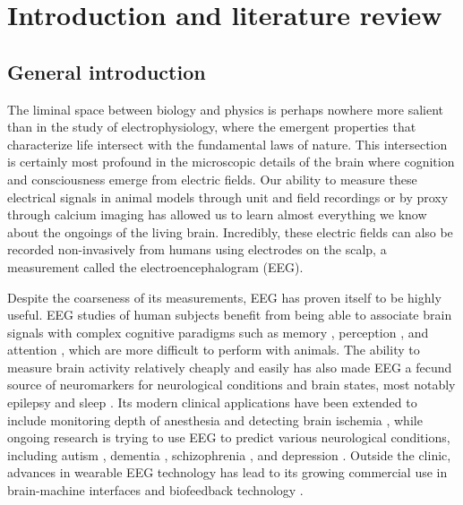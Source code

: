 \chapter{Introduction and literature review} \label{sec:intro}


\section{General introduction}

The liminal space between biology and physics is perhaps nowhere more salient than in the study of electrophysiology, where the emergent properties that characterize life intersect with the fundamental laws of nature. This intersection is certainly most profound in the microscopic details of the brain where cognition and consciousness emerge from electric fields. Our ability to measure these electrical signals in animal models through unit and field recordings or by proxy through calcium imaging has allowed us to learn almost everything we know about the ongoings of the living brain. Incredibly, these electric fields can also be recorded non-invasively from humans using electrodes on the scalp, a measurement called the electroencephalogram (EEG). 

Despite the coarseness of its measurements, EEG has proven itself to be highly useful. EEG studies of human subjects benefit from being able to associate brain signals with complex cognitive paradigms such as memory \cite{Osipova2006, Sauseng2009, Sauseng2010}, perception \cite{Rodriguez1999, Melloni2007,Fahrenfort2012}, and attention \cite{Hillyard1998, Makeig2002}, which are more difficult to perform with animals. The ability to measure brain activity relatively cheaply and easily has also made EEG a fecund source of neuromarkers for neurological conditions and brain states, most notably epilepsy \cite{Engel1984,Noachtar2009} and sleep \cite{Wolpert1969, Prerau2016}. Its modern clinical applications have been extended to include monitoring depth of anesthesia \cite{Michael2008} and detecting brain ischemia \cite{Meghdadi2021}, while ongoing research is trying to use EEG to predict various neurological conditions, including autism \cite{Bosl2018}, dementia \cite{Meghdadi2021}, schizophrenia \cite{Meghdadi2021}, and depression \cite{DeAguiarNeto2019}. Outside the clinic, advances in wearable EEG technology has lead to its growing commercial use in brain-machine interfaces \cite{Mahmood2021} and biofeedback technology \cite{Hunkin2021}. 

